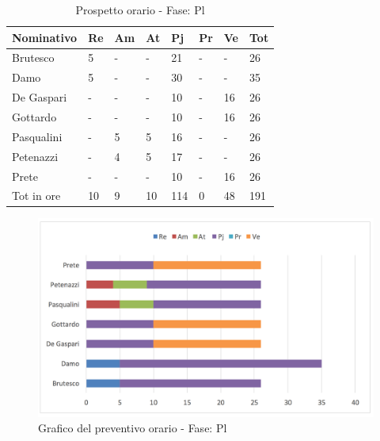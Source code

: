 							\begin{table}[H] \begin{center} \begin{tabular}{llllllll}
							\toprule
							\textbf{Nominativo}	&	\textbf{Re}	&	\textbf{Am}	&	\textbf{At}	&	\textbf{Pj}	&	\textbf{Pr}	&	\textbf{Ve}	&	\textbf{Tot}\\
							\midrule
							Brutesco	&	5	&	-	&	-	&	21	&	-	&	-	&	26	 \\
							Damo	&	5	&	-	&	-	&	30	&	-	&	-	&	35	 \\
							De Gaspari	&	-	&	-	&	-	&	10	&	-	&	16	&	26	 \\
							Gottardo	&	-	&	-	&	-	&	10	&	-	&	16	&	26	 \\
							Pasqualini	&	-	&	5	&	5	&	16	&	-	&	-	&	26	 \\
							Petenazzi	&	-	&	4	&	5	&	17	&	-	&	-	&	26	 \\
							Prete	&	-	&	-	&	-	&	10	&	-	&	16	&	26	 \\
							\midrule
							Tot in ore	&	10	&	9	&	10	&	114	&	0	&	48	&	191	 \\



							\bottomrule
							\end{tabular} \end{center} \caption{Prospetto orario - Fase:
							Pl
							}\label{tab:h_Pl} \end{table}		\begin{figure}[H]  \centering  \includegraphics[scale=0.43]{img/h_Pl}
									\caption{Grafico del preventivo orario - Fase: Pl}  \label{fig:h_Pl"} 		\end{figure}



